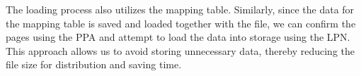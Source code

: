 The loading process also utilizes the mapping table.
Similarly, since the data for the mapping table is saved and loaded together with the file, we can confirm the pages using the PPA and attempt to load the data into storage using the LPN.
This approach allows us to avoid storing unnecessary data, thereby reducing the file size for distribution and saving time.

